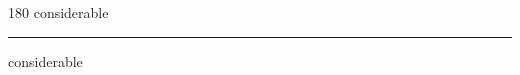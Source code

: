 
\begin{frame}
\begin{center}
\begin{turn}{180}
{\fontsize{2.5cm}{1em}\selectfont considerable}
\end{turn}
\vspace{1em}\par  
\hrule
\vspace{1em}\par  
{\fontsize{2.5cm}{1em}\selectfont considerable}
\end{center}
\end{frame}
